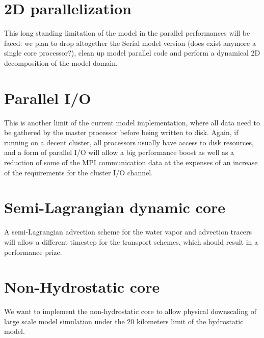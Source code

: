 \section{2D parallelization}

This long standing limitation of the model in the parallel performances will
be faced: we plan to drop altogether the Serial model version (does exist
anymore a single core processor?), clean up model parallel code and perform
a dynamical 2D decomposition of the model domain.

\section{Parallel I/O}

This is another limit of the current model implementation, where all data
need to be gathered by the master processor before being written to disk.
Again, if running on a decent cluster, all processors usually have access
to disk resources, and a form of parallel I/O will allow a big performance
boost as well as a reduction of some of the MPI communication data at the
expenses of an increase of the requirements for the cluster I/O channel.

\section{Semi-Lagrangian dynamic core}

A semi-Lagrangian advection scheme for the water vapor and advection tracers
will allow a different timestep for the transport schemes, which should result
in a performance prize.

\section{Non-Hydrostatic core}

We want to implement the non-hydrostatic core to allow physical downscaling
of large scale model simulation under the 20 kilometers limit of the
hydrostatic model.
